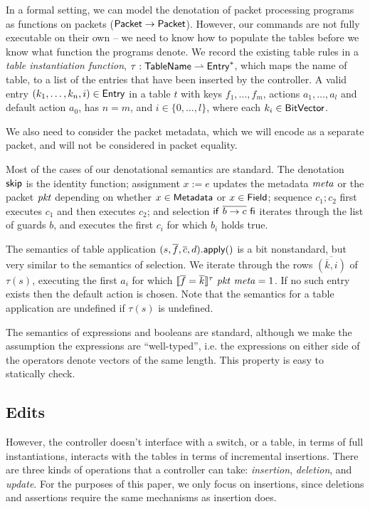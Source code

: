 In a formal setting, we can model the denotation of packet processing
programs as functions on packets ($\mathsf{Packet} \to \mathsf{Packet}$). However, our
commands are not fully executable on their own -- we need to know how
to populate the tables before we know what function the programs
denote. We record the existing table rules in a \emph{table
  instantiation function},
$\tau : \mathsf{TableName} \rightharpoonup \mathsf{Entry}^*$, which maps the name of
table, to a list of the entries that have been inserted by the
controller. A valid entry $(k_1,\ldots, k_n, i) \in \mathsf{Entry}$ in a table
$t$ with keys $f_1, \ldots, f_m$, actions $a_1, \ldots, a_l$ and
default action $a_0$, has $n = m$, and $i \in \{0, \ldots, l\}$, where
each $k_i \in \mathsf{BitVector}$.

We also need to consider the packet metadata, which we will encode as
a separate packet, and will not be considered in packet equality.

Most of the cases of our denotational semantics are standard. The
denotation $\mathsf{skip}$ is the identity function; assignment $x := e$
updates the metadata $\mathit{meta}$ or the packet $\mathit{pkt}$ depending on whether
$x \in \mathsf{Metadata}$ or $x \in \mathsf{Field}$; sequence $c_1;c_2$ first executes
$c_1$ and then executes $c_2$; and selection
$\mathsf{if}~\overline{b \to c}~\mathsf{fi}$ iterates through the list of guards
$b$, and executes the first $c_i$ for which $b_i$ holds true.

The semantics of table application
$(s, \overline f, \overline c, d).\mathsf{apply}()$ is a bit nonstandard, but
very similar to the semantics of selection. We iterate through the
rows $\overline{(\overline k, i)}$ of $\tau(s)$, executing the first
$a_i$ for which
$\llbracket \overline f = \overline k \rrbracket^\tau~\mathit{pkt}~\mathit{meta} = 1$. If no such
entry exists then the default action is chosen. Note that the
semantics for a table application are undefined if $\tau(s)$ is
undefined.

The semantics of expressions and booleans are standard, although we
make the assumption the expressions are ``well-typed'', i.e. the
expressions on either side of the operators denote vectors of the same
length. This property is easy to statically check.

\subsection{Edits}

However, the controller doesn't interface with a switch, or a table,
in terms of full instantiations, interacts with the tables in terms of
incremental insertions. There are three kinds of operations that a
controller can take: \emph{insertion}, \emph{deletion}, and
\emph{update}. For the purposes of this paper, we only focus on
insertions, since deletions and assertions require the same mechanisms
as insertion does.

